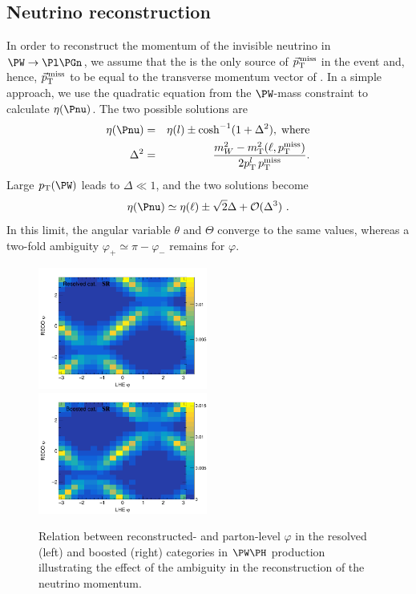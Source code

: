 \documentclass[a4paper,11pt]{article}
\begin{document}
\subsection{Neutrino reconstruction}
\label{sec:neu_reco}

In order to reconstruct the momentum of the invisible neutrino in $\PW\rightarrow\Pl\Pgn$, we assume that the \Pnu is the only source of ${\vec p}_{\mathrm{T}}^{\kern1pt\text{miss}}$ in the event and, hence, ${\vec p}_{\mathrm{T}}^{\kern1pt\text{miss}}$ to be equal to the transverse momentum vector of \Pnu. 
In a simple approach, we use the quadratic equation from the $\PW$-mass constraint to calculate $\eta(\Pnu)$. 
The two possible solutions are
\begin{eqnarray}
\eta(\Pnu) &=& {\eta}(l) \pm \cosh^{-1}(1+{\Delta}^2),\;\textrm{where}\label{Eq:NeuEta}\\
{\Delta}^2 &=& \frac{m_W^2 - m_\textrm{T}^2 (\ell,{p_\textrm{T}^\text{miss}\xspace})}{2 p_\textrm{T}^{l}\, p_\textrm{T}^\textrm{miss}}. 
\end{eqnarray}
Large $\pt(\PW)$ leads to $\Delta \ll 1$, and the two solutions become 
\begin{equation}
{\eta}(\Pnu) \simeq {\eta}(\ell) \pm \sqrt{2}{\Delta} + {\cal{O}} ({\Delta}^3)	\ .
\label{Eq:NeuEta2}
\end{equation}
In this limit,  the angular variable $\theta$ and $\Theta$ converge to the same values, whereas a two-fold ambiguity  $\varphi_{+} \simeq \pi - \varphi_{-}$ remains for $\varphi$. 
\begin{figure}[hbtp]
\begin{center}
\includegraphics[width=0.495\textwidth]{Figures/New/RECO/Resolved_Plot_2D_phi_unweighted.png}
\includegraphics[width=0.495\textwidth]{Figures/New/RECO/Boosted_Plot_2D_phi_unweighted.png}
\end{center}
\caption{
Relation between reconstructed- and parton-level $\varphi$ in the resolved (left) and boosted (right) categories in $\PW\PH$ production illustrating the effect of the ambiguity in the reconstruction of the neutrino momentum. 
}
\label{fig:neureco}
\end{figure}
\end{document}

